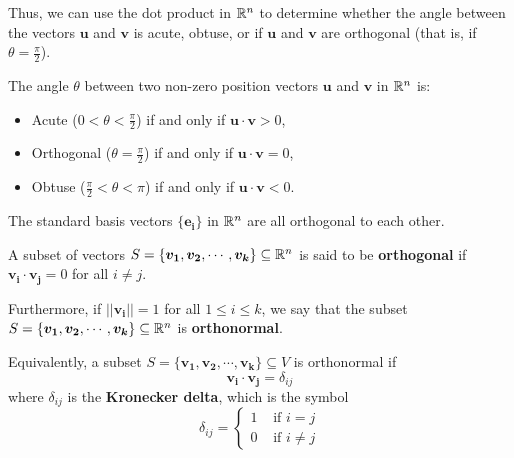 Thus, we can use the dot product in $\mathbb{R}^n$ to determine whether the angle between the vectors $\bm{u}$ and $\bm{v}$ is acute, obtuse, or if $\bm{u}$ and $\bm{v}$ are orthogonal (that is, if $\theta = \frac{\pi}{2}$).


\begin{proposition}
    The angle $\theta$ between two non-zero position vectors $\bm{u}$ and $\bm{v}$ in $\mathbb{R}^n$ is:
    \begin{itemize}
        \item Acute ($0 < \theta < \frac{\pi}{2}$) if and only if  $\bm{u} \cdot \bm{v} > 0$,
        \item Orthogonal ($\theta = \frac{\pi}{2}$) if and only if $\bm{u} \cdot \bm{v} = 0$,
        \item Obtuse ($\frac{\pi}{2} < \theta < \pi$) if and only if $\bm{u} \cdot \bm{v} < 0$.
    \end{itemize}
    
    \end{proposition}   

\begin{example}
    The standard basis vectors $\{\bm{e_i}\}$ in $\mathbb{R}^n$ are all orthogonal to each other.
\end{example}


\begin{definition}
    A subset of vectors $S = \{\bm{v_1}, \bm{v_2}, \cdots, \bm{v_k}\} \subseteq \mathbb{R}^n$ is said to be \textbf{orthogonal} if $ \bm{v_i} \cdot \bm{v_j}= 0$ for all $i \neq j$.
    
    \vspace{1em}
    
    Furthermore, if $||\bm{v_i}|| = 1$ for all $1 \leq i \leq k$, we say that the subset $S = \{\bm{v_1}, \bm{v_2}, \cdots, \bm{v_k}\} \subseteq \mathbb{R}^n$ is \textbf{orthonormal}.
\end{definition}

\begin{proposition}
        Equivalently, a subset $S = \{\bm{v_1}, \bm{v_2}, \cdots, \bm{v_k}\} \subseteq V$ is orthonormal if $$\bm{v_i} \cdot \bm{v_j} = \delta_{ij}$$ 
        where $\delta_{ij}$ is the \textbf{Kronecker delta}, which is the symbol $$\delta_{ij} = \left\{
		\begin{array}{ll}
			1 & \text{ if } i = j \\
			0 & \text{ if } i \neq j
		\end{array}
		\right.$$
    \end{proposition}

